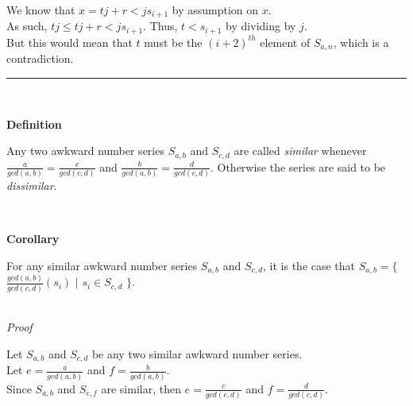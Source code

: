 \documentclass[a4paper,12pt]{article}
\begin{document}
\noindent We know that $x = tj + r < js_{i+1}$ by assumption on $x$.\\

\noindent As such, $tj \leq tj + r < js_{i+1}$. Thus, $t < s_{i + 1}$ by dividing by $j$.\\

\noindent But this would mean that $t$ must be the $(i + 2)^{th}$ element of $S_{a, n}$, which is a contradiction.


\begin{center}
\noindent\rule{8cm}{0.4pt}
\end{center}
\noindent \\









\label{definition:similar_series}
\hypertarget{definition:similar_series}{}
\begin{tcolorbox}
\textbf{Definition}

Any two awkward number series $S_{a,b}$ and $S_{c,d}$ are called \textit{similar} whenever $\frac{a}{gcd(a,b)} = \frac{c}{gcd(c,d)}$ and $\frac{b}{gcd(a,b)} = \frac{d}{gcd(c,d)}$. Otherwise the series are said to be \textit{dissimilar}.

\end{tcolorbox}
\noindent \\







\label{corollary:similar_corollary}
\hypertarget{corollary:similar_corollary}{}
\begin{tcolorbox}
\textbf{Corollary}

\noindent For any similar awkward number series $S_{a, b}$ and $S_{c, d}$, it is the case that $S_{a, b} = \{$ $\frac{gcd(a,b)}{gcd(c,d)}(s_i)$ $|$ $s_i \in S_{c, d}$ $\}$.
\end{tcolorbox}

\noindent \\
\textit{Proof}

\noindent Let $S_{a, b}$ and $S_{c, d}$ be any two similar awkward number series.\\

\noindent Let $e = \frac{a}{gcd(a,b)}$ and $f = \frac{b}{gcd(a,b)}$.\\

\noindent Since $S_{a, b}$ and $S_{e,f}$ are similar, then $e = \frac{c}{gcd(c,d)}$ and $f = \frac{d}{gcd(c,d)}$.\\
\end{document}
